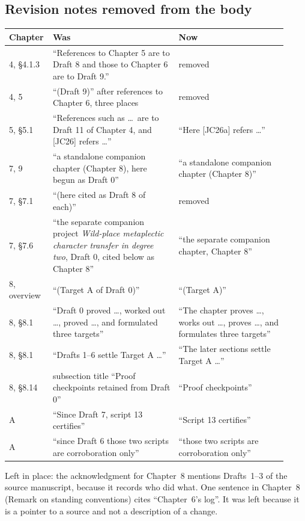 \documentclass[12pt,letterpaper]{article}
\begin{document}
\subsection{Revision notes removed from the body}
\begin{center}\small
\begin{longtable}{@{}p{0.10\linewidth}p{0.44\linewidth}p{0.38\linewidth}@{}}\toprule
Chapter & Was & Now\\\midrule\endhead
4, \S4.1.3 & ``References to Chapter 5 are to Draft 8 and those to Chapter 6 are to Draft 9.'' & removed\\
4, 5 & ``(Draft 9)'' after references to Chapter 6, three places & removed\\
5, \S5.1 & ``References such as \ldots\ are to Draft 11 of Chapter 4, and [JC26] refers \ldots'' & ``Here [JC26a] refers \ldots''\\
7, 9 & ``a standalone companion chapter (Chapter 8), here begun as Draft 0'' & ``a standalone companion chapter (Chapter 8)''\\
7, \S7.1 & ``(here cited as Draft 8 of each)'' & removed\\
7, \S7.6 & ``the separate companion project \emph{Wild-place metaplectic character transfer in degree two}, Draft 0, cited below as Chapter 8'' & ``the separate companion chapter, Chapter 8''\\
8, overview & ``(Target A of Draft 0)'' & ``(Target A)''\\
8, \S8.1 & ``Draft 0 proved \ldots, worked out \ldots, proved \ldots, and formulated three targets'' & ``The chapter proves \ldots, works out \ldots, proves \ldots, and formulates three targets''\\
8, \S8.1 & ``Drafts 1--6 settle Target A \ldots'' & ``The later sections settle Target A \ldots''\\
8, \S8.14 & subsection title ``Proof checkpoints retained from Draft 0'' & ``Proof checkpoints''\\
A & ``Since Draft 7, script 13 certifies'' & ``Script 13 certifies''\\
A & ``since Draft 6 those two scripts are corroboration only'' & ``those two scripts are corroboration only''\\
\bottomrule
\end{longtable}
\end{center}
Left in place: the acknowledgment for Chapter~8 mentions Drafts~1--3 of the source manuscript, because it records who did what. One sentence in Chapter~8 (Remark on standing conventions) cites ``Chapter~6's log''. It was left because it is a pointer to a source and not a description of a change.
\end{document}
